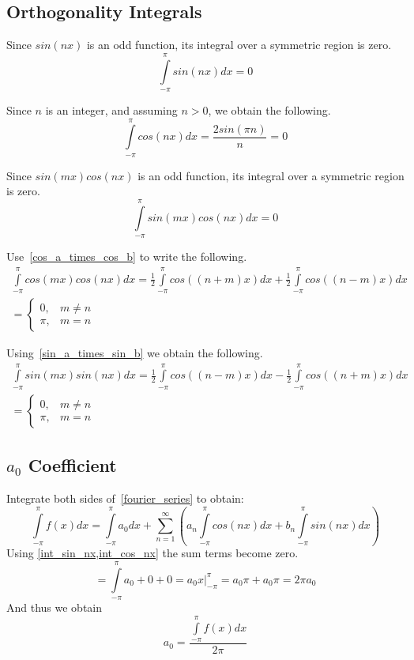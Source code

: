 \documentclass[a4paper]{article}
\begin{document}
\subsection{Orthogonality Integrals}\label{fs:integrals}
Since $sin(n x)$ is an odd function, its integral  over a symmetric region is zero.
\begin{equation}\label{fs:int_sin_nx}
\int \limits_{-\pi}^{\pi} sin(n x) dx = 0
\end{equation}

Since $n$ is an integer, and assuming $n>0$, we obtain the following.
\begin{equation}\label{fs:int_cos_nx}
\int \limits_{-\pi}^{\pi} cos(n x) dx = \frac{2 sin(\pi n)}{n}=0
\end{equation}

Since $sin(m x) cos(n x)$ is an odd function, its integral  over a symmetric region is zero.
\begin{equation}\label{fs:int_sin_mx_cos_nx}
\int \limits_{-\pi}^{\pi} sin(m x) cos(n x) dx = 0
\end{equation}

Use~\cref{cos_a_times_cos_b} to write the following.
\begin{multline}\label{fs:int_cos_mx_cos_nx}
\int \limits_{-\pi}^{\pi} cos(m x) cos(n x) dx = 
\frac{1}{2} \int \limits_{-\pi}^{\pi} cos((n+m) x) dx + \frac{1}{2} \int \limits_{-\pi}^{\pi}
cos((n-m) x) dx \\
=\begin{cases} 0, & m \neq n \\ \pi, &m=n \end{cases}
\end{multline}

Using~\cref{sin_a_times_sin_b} we obtain the following.
\begin{multline}\label{fs:int_sin_mx_sin_nx}
\int \limits_{-\pi}^{\pi} sin(m x) sin(n x) dx
=\frac{1}{2} \int \limits_{-\pi}^{\pi} cos((n-m) x) dx - \frac{1}{2} \int \limits_{-\pi}^{\pi}
cos((n+m) x) dx \\
=\begin{cases} 0, & m \neq n \\ \pi, &m=n \end{cases}
\end{multline}


\subsection{$a_0$ Coefficient}\label{fs:a0_coefficient}
Integrate both sides of~\cref{fourier_series} to obtain:
$$\int \limits_{-\pi}^{\pi} f(x) dx = \int \limits_{-\pi}^{\pi} a_0 dx + \sum \limits_{n=1}^{\infty} (a_n \int \limits_{-\pi}^{\pi} cos(n x) dx + b_n \int \limits_{-\pi}^{\pi} sin(n x) dx)$$
Using \cref{int_sin_nx,int_cos_nx} the sum terms become zero.
$$=\int \limits_{-\pi}^{\pi} a_0 +0+0=a_0 x|_{-\pi}^{\pi}=a_0 \pi + a_0 \pi = 2\pi a_0$$
And thus we obtain
\begin{equation}\label{fs:a0}
a_0 = \frac{\int \limits_{-\pi}^{\pi} f(x) dx}{2\pi}
\end{equation}
\end{document}
